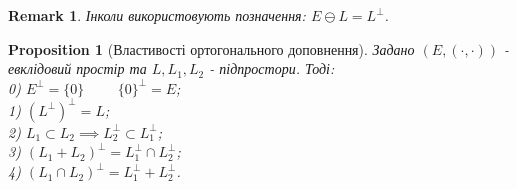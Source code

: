 \documentclass[a4paper, 10pt]{article}
\theoremstyle{theoremdd}
\theoremstyle{theoremdd}
\theoremstyle{theoremdd}
\theoremstyle{theoremdd}
\theoremstyle{theoremdd}
\newtheorem{proposition}[theorem]{Proposition}
\theoremstyle{theoremdd}
\newtheorem{remark}[theorem]{Remark}
\theoremstyle{theoremdd}
\theoremstyle{theoremdd}
\begin{document}
\begin{remark}
Інколи використовують позначення: $E \ominus L = L^{\perp}$.
\end{remark}

\begin{proposition}[Властивості ортогонального доповнення]
Задано $(E,(\cdot,\cdot))$ - евклідовий простір та $L,L_1,L_2$ - підпростори. Тоді:\\
0) $E^{\perp} = \{0\} \hspace{1cm} \{0\}^{\perp} = E$;\\
1) $(L^{\perp})^{\perp} = L$;\\
2) $L_1 \subset L_2 \implies L_2^{\perp} \subset L_1^{\perp}$;\\
3) $(L_1+L_2)^{\perp} = L_1^{\perp} \cap L_2^{\perp}$;\\
4) $(L_1 \cap L_2)^{\perp} = L_1^{\perp} + L_2^{\perp}$.\\
\end{proposition}
\end{document}
